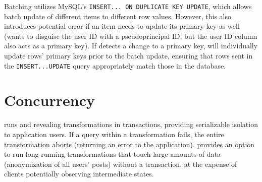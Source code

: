 %
Batching utilizes MySQL's \texttt{INSERT... ON DUPLICATE KEY UPDATE}, which
allows batch update of different items to different row values. However, this
also introduces potential error if an item needs to update its primary key as
well (\eg wants to \sys disguise the user ID with a pseudoprincipal ID,
but the user ID column also acts as a primary key). If \sys detects a change to
a primary key, \sys will individually update rows' primary keys prior to the
batch update, ensuring that rows sent in the \texttt{INSERT...UPDATE} query 
appropriately match those in the database.

%
\section{Concurrency}
%
\sys runs \xxing and revealing transformations in transactions, providing
serializable isolation to application users.
%
If a query within a transformation fails, the entire transformation aborts
(returning an error to the application).
%
\sys provides an option to run long-running transformations that
touch large amounts of data (\eg anonymization of all users' posts) without a
transaction, at the expense of clients potentially observing intermediate
states.
%


%
%

%

